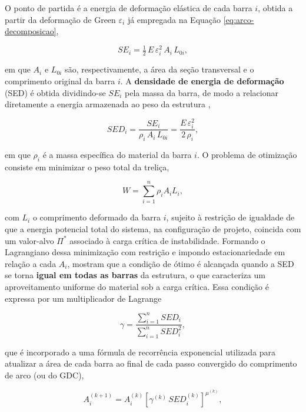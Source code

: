 O ponto de partida é a energia de deformação elástica de cada
barra $i$, obtida a partir da deformação de Green $\varepsilon_i$
já empregada na Equação \ref{eq:arco-decomposicao},
 
\begin{equation}
  SE_i = \tfrac{1}{2}\, E\, \varepsilon_i^2\, A_i\, L_{0i},
  \label{eq:se}
\end{equation}
 
em que $A_i$ e $L_{0i}$ são, respectivamente, a área da seção
transversal e o comprimento original da barra $i$. A
\textbf{densidade de energia de deformação} (SED) é obtida
dividindo-se $SE_i$ pela massa da barra, de modo a relacionar
diretamente a energia armazenada ao peso da estrutura
\cite{hrinda_nguyen2008},
 
\begin{equation}
  SED_i = \dfrac{SE_i}{\rho_i\, A_i\, L_{0i}}
        = \dfrac{E\, \varepsilon_i^2}{2\, \rho_i},
  \label{eq:sed}
\end{equation}
 
em que $\rho_i$ é a massa específica do material da barra $i$. O
problema de otimização consiste em minimizar o peso total da
treliça,
 
\begin{equation}
  W = \sum_{i=1}^{n} \rho_i A_i L_i,
  \label{eq:peso}
\end{equation}
 
com $L_i$ o comprimento deformado da barra $i$, sujeito à restrição
de igualdade de que a energia potencial total do sistema, na
configuração de projeto, coincida com um valor-alvo $\Pi^{*}$
associado à carga crítica de instabilidade. Formando o Lagrangiano
dessa minimização com restrição e impondo estacionariedade em
relação a cada $A_i$, \citealp{hrinda_nguyen2008} mostram que a
condição de ótimo é alcançada quando a SED se torna \textbf{igual
em todas as barras} da estrutura, o que caracteriza um
aproveitamento uniforme do material sob a carga crítica. Essa
condição é expressa por um multiplicador de Lagrange
 
\begin{equation}
  \gamma = \dfrac{\sum_{i=1}^{n} SED_i}{\sum_{i=1}^{n} SED_i^2},
  \label{eq:lagrange}
\end{equation}
 
que é incorporado a uma fórmula de recorrência exponencial
utilizada para atualizar a área de cada barra ao final de cada
passo convergido do comprimento de arco (ou do GDC),
 
\begin{equation}
  A_i^{(k+1)} = A_i^{(k)}
  \left[\gamma^{(k)}\, SED_i^{(k)}\right]^{\mu^{(k)}},
  \label{eq:recorrencia}
\end{equation}
 
